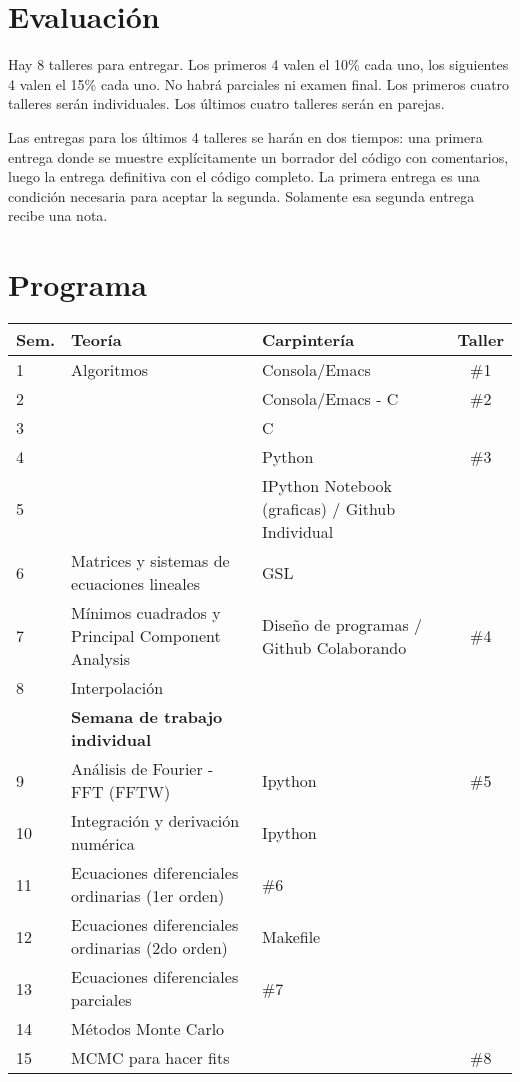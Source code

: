 \documentclass[12pt]{article}
\begin{document}
\section*{Evaluaci\'on}

Hay 8 talleres para entregar. Los primeros 4 valen el 10\% cada uno, los siguientes 4 valen el 15\% cada uno. No habr\'a parciales ni examen final. Los primeros cuatro talleres ser\'an individuales. Los \'ultimos cuatro talleres ser\'an en parejas. 

Las entregas para los \'ultimos 4 talleres se har\'an en dos tiempos: una primera entrega donde se muestre expl\'icitamente un borrador del c\'odigo con comentarios, luego la entrega definitiva con el c\'odigo completo. La primera entrega es una condici\'on necesaria para aceptar la segunda. Solamente esa segunda entrega recibe una nota.

 \newpage
\section*{Programa}

\begin{center}
\begin{tabular}{|p{1cm}|p{6cm}|p{5cm}|c|}
\hline
Sem. & Teor\'ia & Carpinter\'ia & Taller \\\hline
1 & Algoritmos	&Consola/Emacs & \#1\\
2 & 	& Consola/Emacs - C  & \#2\\
3 & 	&C  &    \\
4 & 	&Python & \#3\\
5 & 	&IPython Notebook (graficas) / Github Individual & \\
6 &     Matrices y sistemas de ecuaciones lineales  & GSL & \\
7 & M\'inimos cuadrados y Principal Component Analysis& Dise\~no de programas / Github Colaborando & \#4\\ 
8 & Interpolaci\'on & & \\
 & {\bf Semana de trabajo individual} & &\\
9 & An\'alisis de Fourier - FFT  (FFTW)&  Ipython & \#5 \\
10 & Integraci\'on y derivaci\'on num\'erica & Ipython &\\
11 & Ecuaciones diferenciales ordinarias (1er orden)& \#6 &\\
12 & Ecuaciones diferenciales ordinarias (2do orden)&  Makefile & \ \\
13 & Ecuaciones diferenciales parciales &  \#7& \\
14 & M\'etodos Monte Carlo &   &  \\
15 & MCMC para hacer fits &    & \#8 \\

\hline
\end{tabular}
\end{center}
\end{document}
